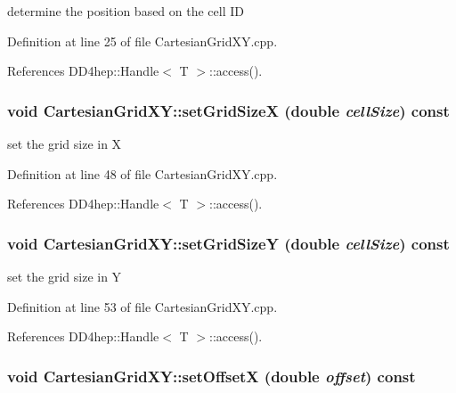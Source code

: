 determine the position based on the cell ID 

Definition at line 25 of file CartesianGridXY.cpp.

References DD4hep::Handle$<$ T $>$::access().\hypertarget{class_d_d4hep_1_1_geometry_1_1_cartesian_grid_x_y_ad0f17de0932fd9fb1f0381725bee635a}{
\subsubsection[{setGridSizeX}]{\setlength{\rightskip}{0pt plus 5cm}void CartesianGridXY::setGridSizeX (double {\em cellSize}) const}}
\label{class_d_d4hep_1_1_geometry_1_1_cartesian_grid_x_y_ad0f17de0932fd9fb1f0381725bee635a}


set the grid size in X 

Definition at line 48 of file CartesianGridXY.cpp.

References DD4hep::Handle$<$ T $>$::access().\hypertarget{class_d_d4hep_1_1_geometry_1_1_cartesian_grid_x_y_ad688789df1c8ec07e14090030a0ac708}{
\subsubsection[{setGridSizeY}]{\setlength{\rightskip}{0pt plus 5cm}void CartesianGridXY::setGridSizeY (double {\em cellSize}) const}}
\label{class_d_d4hep_1_1_geometry_1_1_cartesian_grid_x_y_ad688789df1c8ec07e14090030a0ac708}


set the grid size in Y 

Definition at line 53 of file CartesianGridXY.cpp.

References DD4hep::Handle$<$ T $>$::access().\hypertarget{class_d_d4hep_1_1_geometry_1_1_cartesian_grid_x_y_a72c916a5a3367617353ae2618b87fbf0}{
\subsubsection[{setOffsetX}]{\setlength{\rightskip}{0pt plus 5cm}void CartesianGridXY::setOffsetX (double {\em offset}) const}}
\label{class_d_d4hep_1_1_geometry_1_1_cartesian_grid_x_y_a72c916a5a3367617353ae2618b87fbf0}


